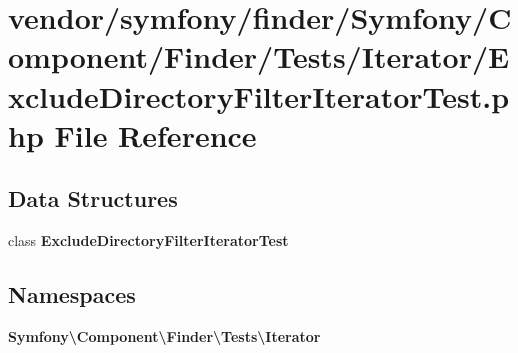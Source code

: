 \section{vendor/symfony/finder/\+Symfony/\+Component/\+Finder/\+Tests/\+Iterator/\+Exclude\+Directory\+Filter\+Iterator\+Test.php File Reference}
\label{_exclude_directory_filter_iterator_test_8php}
\subsection*{Data Structures}
\begin{DoxyCompactItemize}
\item 
class {\bf Exclude\+Directory\+Filter\+Iterator\+Test}
\end{DoxyCompactItemize}
\subsection*{Namespaces}
\begin{DoxyCompactItemize}
\item 
 {\bf Symfony\textbackslash{}\+Component\textbackslash{}\+Finder\textbackslash{}\+Tests\textbackslash{}\+Iterator}
\end{DoxyCompactItemize}
